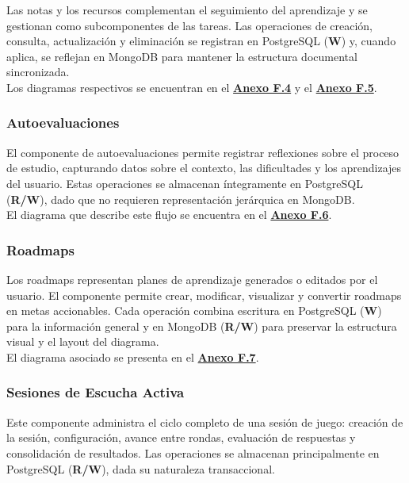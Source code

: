 Las notas y los recursos complementan el seguimiento del aprendizaje y se gestionan como subcomponentes de las tareas. Las operaciones de creación, consulta, actualización y eliminación se registran en PostgreSQL (\textbf{W}) y, cuando aplica, se reflejan en MongoDB para mantener la estructura documental sincronizada.
\\

Los diagramas respectivos se encuentran en el \hyperref[fig:anexoF-task-notes]{\textbf{Anexo F.4}} y el \hyperref[fig:anexoF-task-resources]{\textbf{Anexo F.5}}.

\subsubsection{Autoevaluaciones}

El componente de autoevaluaciones permite registrar reflexiones sobre el proceso de estudio, capturando datos sobre el contexto, las dificultades y los aprendizajes del usuario. Estas operaciones se almacenan íntegramente en PostgreSQL (\textbf{R/W}), dado que no requieren representación jerárquica en MongoDB.
\\

El diagrama que describe este flujo se encuentra en el \hyperref[fig:anexoF-self-evaluations]{\textbf{Anexo F.6}}.

\subsubsection{Roadmaps}

Los roadmaps representan planes de aprendizaje generados o editados por el usuario. El componente permite crear, modificar, visualizar y convertir roadmaps en metas accionables. Cada operación combina escritura en PostgreSQL (\textbf{W}) para la información general y en MongoDB (\textbf{R/W}) para preservar la estructura visual y el layout del diagrama.
\\

El diagrama asociado se presenta en el \hyperref[fig:anexoF-roadmaps]{\textbf{Anexo F.7}}.

\subsubsection{Sesiones de Escucha Activa}

Este componente administra el ciclo completo de una sesión de juego: creación de la sesión, configuración, avance entre rondas, evaluación de respuestas y consolidación de resultados. Las operaciones se almacenan principalmente en PostgreSQL (\textbf{R/W}), dada su naturaleza transaccional.
\\

